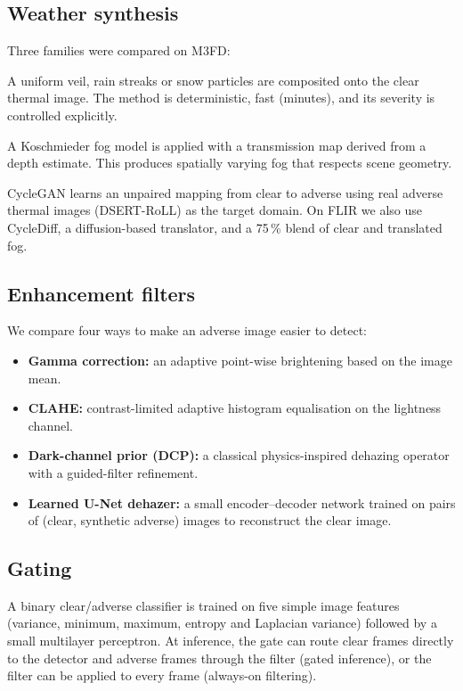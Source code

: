 \documentclass[11pt,a4paper]{article}
\begin{document}
\subsection{Weather synthesis}
\label{sec:m3fd-methods}
Three families were compared on M3FD:
\begin{description}[leftmargin=1.4em,style=nextline]
  \item[Classical overlays.] A uniform veil, rain streaks or snow particles are
        composited onto the clear thermal image. The method is deterministic,
        fast (minutes), and its severity is controlled explicitly.
  \item[Depth-aware fog.] A Koschmieder fog model is applied with a
        transmission map derived from a depth estimate. This produces spatially
        varying fog that respects scene geometry.
  \item[Learned translation.] CycleGAN\cite{cyclegan} learns an unpaired mapping from clear to
        adverse using real adverse thermal images (DSERT-RoLL) as the target
        domain. On FLIR we also use CycleDiff\cite{cyclediff}, a diffusion-based translator, and
        a 75\,\% blend of clear and translated fog.
\end{description}

\subsection{Enhancement filters}
We compare four ways to make an adverse image easier to detect:
\begin{itemize}[leftmargin=1.4em]
  \item \textbf{Gamma correction:} an adaptive point-wise brightening based on
        the image mean.
  \item \textbf{CLAHE:} contrast-limited adaptive histogram equalisation on the
        lightness channel\cite{clahe}.
  \item \textbf{Dark-channel prior (DCP):} a classical physics-inspired dehazing
        operator\cite{dcp} with a guided-filter refinement.
  \item \textbf{Learned U-Net dehazer:} a small encoder--decoder network trained
        on pairs of (clear, synthetic adverse) images to reconstruct the clear
        image.
\end{itemize}

\subsection{Gating}
A binary clear/adverse classifier is trained on five simple image features
(variance, minimum, maximum, entropy and Laplacian variance) followed by a small
multilayer perceptron. At inference, the gate can route clear frames directly to
the detector and adverse frames through the filter (gated inference), or the
filter can be applied to every frame (always-on filtering).
\end{document}
